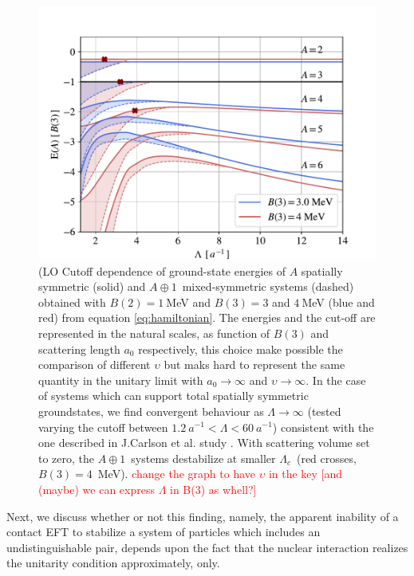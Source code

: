 \documentclass[preprint,12pt]{elsarticle}
\newcommand{\lc}{\ensuremath{\Lambda_c}}
\newcommand{\abb}{\mbox{\ensuremath{A\oplus 1}}}
\newcommand{\red}[1]{\textcolor{red}{#1}}
\begin{document}
%
\begin{figure}
    \centering
        \centering
        \includegraphics[width=\linewidth]{./p-systems-vs-l} 
        \caption{(LO Cutoff dependence of ground-state energies of $A$ spatially symmetric (solid) and \abb~mixed-symmetric systems
        (dashed) obtained with $B(2)=1~$MeV and $B(3)=3$ and $4~$MeV (blue and red) from equation \ref{eq:hamiltonian}. 
        The energies and the cut-off are represented in the natural scales, as function of $B(3)$ and scattering length $a_0$ respectively, this choice make possible the comparison of different $\upsilon$ but maks hard to represent the same quantity in the unitary limit with $a_0\rightarrow\infty$ and $\upsilon\rightarrow\infty$. 
        In the case of systems which can support total spatially symmetric groundstates, we find convergent behaviour as $\Lambda\to\infty$ (tested varying the cutoff between $1.2~a^{-1}<\Lambda<60~a^{-1}$) consistent with the one described in J.Carlson et al. study \cite{manybosons}.
        With scattering volume set to zero, the \abb~systems destabilize at smaller \lc~(red crosses, $B(3)=4$~MeV). 
        \red{change the graph to have $\upsilon$ in the key [and (maybe) we can express $\Lambda$ in B(3) as whell?] }}
        \label{fig:threshold}
\end{figure} 
%

Next, we discuss whether or not this finding, namely, the apparent inability of a contact EFT to stabilize a system of particles
which includes an undistinguishable pair, depends upon the fact that the nuclear interaction realizes the unitarity condition
approximately, only.
\end{document}
